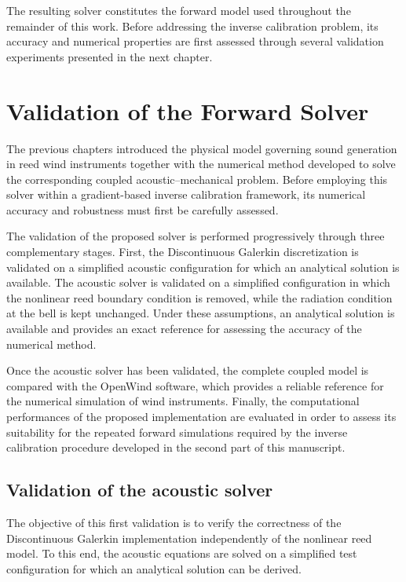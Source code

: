 \documentclass[11pt,a4paper]{report}
\theoremstyle{plain}
\theoremstyle{definition}
\begin{document}
The resulting solver constitutes the forward model used throughout the
remainder of this work. Before addressing the inverse calibration problem, its
accuracy and numerical properties are first assessed through several validation
experiments presented in the next chapter.


\chapter{Validation of the Forward Solver}
\label{chap:validation}

\minitoc

The previous chapters introduced the physical model governing sound generation
in reed wind instruments together with the numerical method developed to solve
the corresponding coupled acoustic--mechanical problem. Before employing this
solver within a gradient-based inverse calibration framework, its numerical
accuracy and robustness must first be carefully assessed.

The validation of the proposed solver is performed progressively through three
complementary stages. First, the Discontinuous Galerkin discretization is
validated on a simplified acoustic configuration for which an analytical
solution is available. The acoustic solver is validated on a simplified configuration in which
the nonlinear reed boundary condition is removed, while the radiation condition
at the bell is kept unchanged. Under these assumptions, an analytical solution
is available and provides an exact reference for assessing the accuracy of the
numerical method.

Once the acoustic solver has been validated, the complete coupled model is
compared with the OpenWind software, which provides a reliable reference for
the numerical simulation of wind instruments. Finally, the computational
performances of the proposed implementation are evaluated in order to assess
its suitability for the repeated forward simulations required by the inverse
calibration procedure developed in the second part of this manuscript.


\section{Validation of the acoustic solver}

The objective of this first validation is to verify the correctness of the
Discontinuous Galerkin implementation independently of the nonlinear reed
model. To this end, the acoustic equations are solved on a simplified test
configuration for which an analytical solution can be derived.
\end{document}
